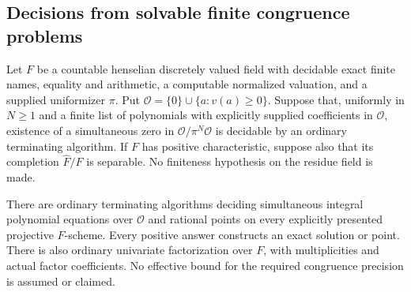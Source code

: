 \subsection{Decisions from solvable finite congruence problems}
\label{C:Greenberg-congruence-subsection}

\begin{lemma}
\label{C:Greenberg-congruence-decisions}
Let $F$ be a countable henselian discretely valued field with
decidable exact finite names, equality and arithmetic, a computable
normalized valuation, and a supplied uniformizer $\pi$.
Put $\mathcal O=\{0\}\cup\{a:v(a)\ge0\}$.
Suppose that, uniformly in $N\ge1$ and a finite list of polynomials
with explicitly supplied coefficients in $\mathcal O$, existence
of a simultaneous zero in $\mathcal O/\pi^N\mathcal O$ is decidable
by an ordinary terminating algorithm.  If $F$ has positive
characteristic, suppose also that its completion $\widehat F/F$
is separable.  No finiteness hypothesis on the residue field is made.

There are ordinary terminating algorithms deciding simultaneous
integral polynomial equations over $\mathcal O$ and rational points
on every explicitly presented projective $F$-scheme.  Every positive
answer constructs an exact solution or point.  There is also ordinary
univariate factorization over $F$, with multiplicities and actual
factor coefficients.  No effective bound for the required congruence
precision is assumed or claimed.
\end{lemma}
